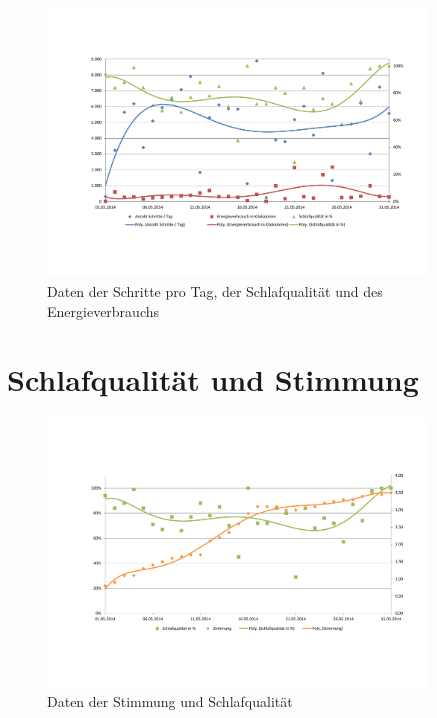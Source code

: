 \begin{figure}[H]
\centering
        \includegraphics[angle=270,width=0.9\textwidth]{images/Analyse/Sleep-Steps-kcal} 
        \caption[Daten der Schritte pro Tag, der Schlafqualität und des Energieverbrauchs]{Daten der Schritte pro Tag, der Schlafqualität und des Energieverbrauchs}
        \label{fig:SchritteSchlafqualitätUndEnergieverbrauch}
\end{figure}


\section{Schlafqualität und Stimmung}
\label{ch:AnalyseUndEvaluierung:sec:SchlafqualitätUndStimmung}

\begin{figure}[H]
\centering
        \includegraphics[angle=270,width=0.9\textwidth]{images/Analyse/Sleep-Mood} 
        \caption[Daten der Stimmung und Schlafqualität]{Daten der Stimmung und Schlafqualität}
        \label{fig:SchlafqualitätUndStimmung}
\end{figure}

